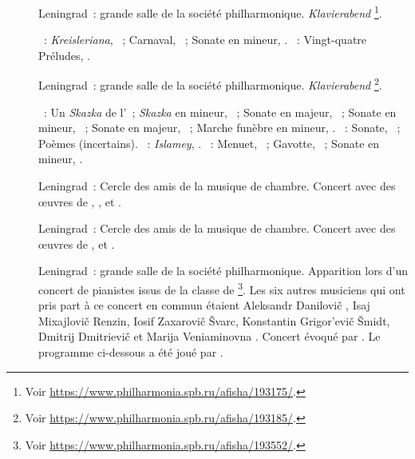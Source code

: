 \begin{description}
 \item[]
 Leningrad~: grande salle de la société philharmonique.
 \foreignlanguage{german}{\emph{Klavierabend}}%
 \footnote{Voir \href{https://www.philharmonia.spb.ru/afisha/193175/}%
 {https://www.philharmonia.spb.ru/afisha/193175/}.}.

 \textsc{\Schumann{}}~: \emph{Kreisleriana}, ~; Carnaval,
 ~; Sonate en \kF \Sharp mineur, .
 \textsc{\Chopin{}}~: Vingt-quatre Préludes, .
 \item[]
 Leningrad~: grande salle de la société philharmonique.
 \foreignlanguage{german}{\emph{Klavierabend}}%
 \footnote{Voir \href{https://www.philharmonia.spb.ru/afisha/193185/}%
 {https://www.philharmonia.spb.ru/afisha/193185/}.}.

 \textsc{\Medtner{}}~: Un \emph{Skazka} de l'~; \emph{Skazka} en
 \kB mineur,  ~; Sonate en \kA \Flat majeur, 
 ~; Sonate en \kD mineur,  ~; Sonate en \kC
 majeur,  ~; Marche funèbre en \kB mineur, 
 .
 \textsc{\Scriabine{}}~: Sonate, ~; Poèmes (incertains).
 \textsc{\Balakirev{}}~: \emph{Islamey}, .
 \textsc{\Prokofiev{}}~: Menuet,  ~; Gavotte, 
 ~; Sonate en \kA mineur, .
 \item[]
 Leningrad~: Cercle des amis de la musique de chambre.
 Concert avec des œuvres de \Schumann{}, \Liszt{}, \Medtner{} et
 \Prokofiev{}.
 \item[]
 Leningrad~: Cercle des amis de la musique de chambre.
 Concert avec des œuvres de \Schumann{}, \Beethoven{} et \Chopin{}.
 \item[]
 Leningrad~: grande salle de la société philharmonique.
 Apparition lors d'un concert de pianistes issus de la classe de
 \LNikolaiev{}%
 \footnote{Voir \href{https://www.philharmonia.spb.ru/afisha/193552/}%
 {https://www.philharmonia.spb.ru/afisha/193552/}.}.
 Les six autres musiciens qui ont pris part à ce concert en commun étaient
 Aleksandr Danilovič \Kamensky{}, Isaj Mixajlovič Renzin, Iosif Zaxarovič
 Švarc, Konstantin Grigor'evič Šmidt, Dmitrij Dmitrievič \Chostakovitch{} et
 Marija Veniaminovna \Yudina{}.
 Concert évoqué par \citet{TADGO19270311}.
 Le programme ci-dessous a été joué par \VSofronitsky{}.


\end{description}
